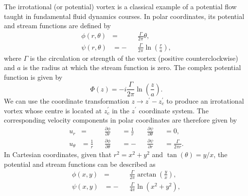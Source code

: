 \documentclass[10pt, twoside]{book}
\begin{document}
			The irrotational (or potential) vortex is a classical example of a potential flow taught in fundamental fluid dynamics courses. In polar coordinates, its potential and stream functions are defined by
			\begin{subequations}
			\label{eq:IrrotVortexDefsPolar}
				\begin{alignat}{2}
					\phi\left(r,\theta\right) &=  &&\frac{\Gamma}{2\pi}\theta,\label{eq:IrrotVortexDefsPolarPhi}\\
					\psi\left(r,\theta\right) &= -&&\frac{\Gamma}{2\pi}\ln\left(\frac{r}{a}\right),\label{eq:IrrotVortexDefsPolarPsi}
				\end{alignat}
			\end{subequations}
			where $\Gamma$ is the circulation or strength of the vortex (positive counterclockwise) and $a$ is the radius at which the stream function is zero. The complex potential function is given by
			\begin{equation}
				\label{eq:IrrotVortexDefPHI}
				\Phi\left(z\right) = -i\frac{\Gamma}{2\pi}\ln\left(\frac{z}{a}\right).
			\end{equation}
			We can use the coordinate transformation $z \rightarrow z^{\prime} - z^{\prime}_c$ to produce an irrotational vortex whose centre is located at $z^{\prime}_c$ in the $z^{\prime}$ coordinate system. The corresponding velocity components in polar coordinates are therefore given by
			\begin{subequations}
			\label{eq:IrrotVortexVelPolar}
				\begin{alignat}{5}
					u_r &= &&\frac{\partial\phi}{\partial r} &&= \frac{1}{r}&&\frac{\partial\psi}{\partial \theta} &&= 0,\label{eq:IrrotVortexVelPolarUr}\\
					u_{\theta} &= \frac{1}{r}&&\frac{\partial\phi}{\partial \theta} &&= -&&\frac{\partial\psi}{\partial r} &&= \frac{\Gamma}{2\pi r}.\label{eq:IrrotVortexVelPolarUt}
				\end{alignat}
			\end{subequations}
			In Cartesian coordinates, given that $r^2 = x^2 + y^2$ and $\tan\left(\theta\right) = y/x$, the potential and stream functions can be described as
			\begin{subequations}
			\label{eq:IrrotVortexDefs}
				\begin{alignat}{2}
					\phi\left(x,y\right) &=  &&\frac{\Gamma}{2\pi}\arctan\left(\frac{y}{x}\right),\label{eq:IrrotVortexDefsPhi}\\
					\psi\left(x,y\right) &= -&&\frac{\Gamma}{4\pi}\ln\left(x^2 + y^2\right),\label{eq:IrrotVortexDefsPsi}
				\end{alignat}
			\end{subequations}
\end{document}
